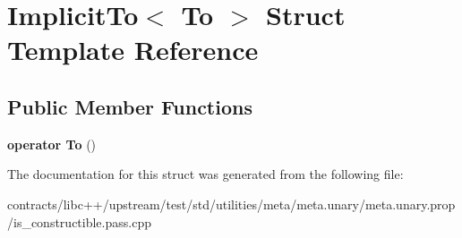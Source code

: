 \hypertarget{struct_implicit_to}{}\section{Implicit\+To$<$ To $>$ Struct Template Reference}
\label{struct_implicit_to}
\subsection*{Public Member Functions}
\begin{DoxyCompactItemize}
\item 
\mbox{\label{struct_implicit_to_a908d51012b729277ff39d31c426db58a}} 
{\bfseries operator To} ()
\end{DoxyCompactItemize}


The documentation for this struct was generated from the following file\+:\begin{DoxyCompactItemize}
\item 
contracts/libc++/upstream/test/std/utilities/meta/meta.\+unary/meta.\+unary.\+prop/is\+\_\+constructible.\+pass.\+cpp\end{DoxyCompactItemize}
